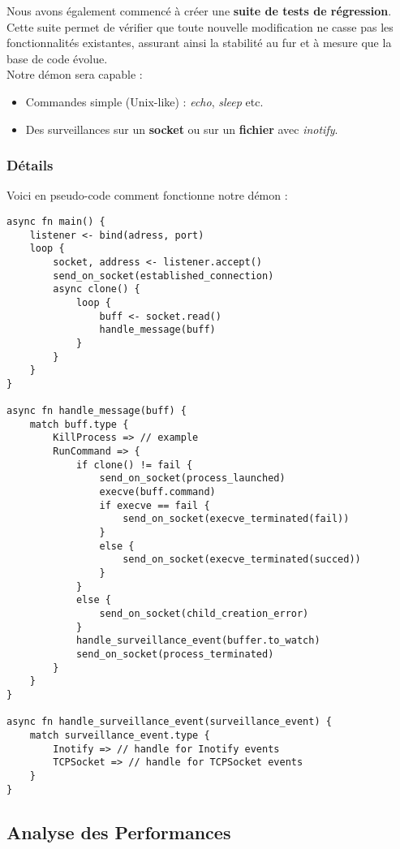 \documentclass{article}
\begin{document}
Nous avons également commencé à créer une \textbf{suite de tests de régression}. Cette suite permet de vérifier que toute nouvelle modification ne casse pas les fonctionnalités existantes, assurant ainsi la stabilité au fur et à mesure que la base de code évolue.\\

Notre démon sera capable : 
\begin{itemize}
    \item Commandes simple (Unix-like) : \textit{echo}, \textit{sleep} etc.
    \item Des surveillances sur un \textbf{socket} ou sur un \textbf{fichier} avec \textit{inotify}.
\end{itemize}


\subsubsection{Détails}

Voici en pseudo-code comment fonctionne notre démon :

\begin{verbatim}
async fn main() {
    listener <- bind(adress, port)
    loop {
        socket, address <- listener.accept()
        send_on_socket(established_connection)
        async clone() {
            loop {
                buff <- socket.read()
                handle_message(buff)
            }
        }
    }
}

async fn handle_message(buff) {
    match buff.type {
        KillProcess => // example
        RunCommand => {
            if clone() != fail {
                send_on_socket(process_launched)
                execve(buff.command)
                if execve == fail {
                    send_on_socket(execve_terminated(fail))
                }
                else {
                    send_on_socket(execve_terminated(succed))
                }
            }
            else {
                send_on_socket(child_creation_error)
            }
            handle_surveillance_event(buffer.to_watch)
            send_on_socket(process_terminated)
        }
    }
}

async fn handle_surveillance_event(surveillance_event) {
    match surveillance_event.type {
        Inotify => // handle for Inotify events
        TCPSocket => // handle for TCPSocket events
    }
}
\end{verbatim}

\subsection{Analyse des Performances}
\end{document}
